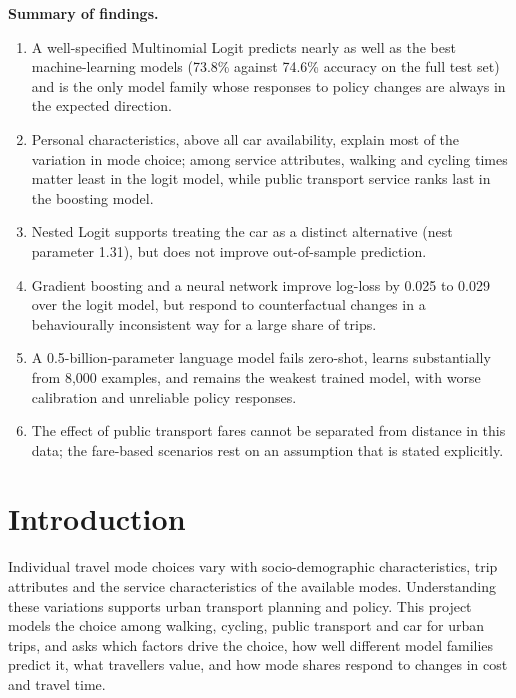 \documentclass[11pt,a4paper]{article}
\begin{document}
\vspace{0.4em}
\noindent\textbf{Summary of findings.}
\begin{enumerate}
\item A well-specified Multinomial Logit predicts nearly as well as the best machine-learning models (73.8\% against 74.6\% accuracy on the full test set) and is the only model family whose responses to policy changes are always in the expected direction.
\item Personal characteristics, above all car availability, explain most of the variation in mode choice; among service attributes, walking and cycling times matter least in the logit model, while public transport service ranks last in the boosting model.
\item Nested Logit supports treating the car as a distinct alternative (nest parameter 1.31), but does not improve out-of-sample prediction.
\item Gradient boosting and a neural network improve log-loss by 0.025 to 0.029 over the logit model, but respond to counterfactual changes in a behaviourally inconsistent way for a large share of trips.
\item A 0.5-billion-parameter language model fails zero-shot, learns substantially from 8,000 examples, and remains the weakest trained model, with worse calibration and unreliable policy responses.
\item The effect of public transport fares cannot be separated from distance in this data; the fare-based scenarios rest on an assumption that is stated explicitly.
\end{enumerate}

\tableofcontents
\newpage

\section{Introduction}

Individual travel mode choices vary with socio-demographic characteristics, trip attributes and the service characteristics of the available modes. Understanding these variations supports urban transport planning and policy. This project models the choice among walking, cycling, public transport and car for urban trips, and asks which factors drive the choice, how well different model families predict it, what travellers value, and how mode shares respond to changes in cost and travel time.
\end{document}
